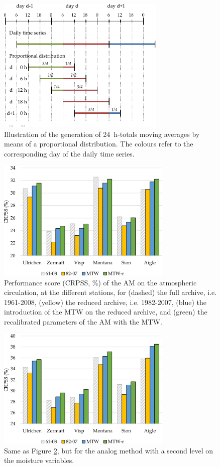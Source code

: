\documentclass[hess, manuscript]{copernicus}
\begin{document}
\begin{figure}[htb]
	\begin{center}
		\includegraphics[width=8cm]{figures/illustration_disaggregation.pdf}
	\end{center}
	\caption{Illustration of the generation of 24~h-totals moving averages by means of a proportional distribution. The colours refer to the corresponding day of the daily time series.}
	\label{fig:illustration_disaggregation}
\end{figure}

\begin{figure}[htb]
	\includegraphics[width=8.3cm]{figures/plots_CRPSS_2Z.pdf}
	\caption{Performance score (CRPSS, \%) of the AM on the atmospheric circulation, at the different stations, for (dashed) the full archive, i.e. 1961-2008, (yellow) the reduced archive, i.e. 1982-2007, (blue) the introduction of the MTW on the reduced archive, and (green) the recalibrated parameters of the AM with the MTW.}
	\label{fig:plots_CRPSS_2Z}
\end{figure}

\begin{figure}[htb]
	\includegraphics[width=8.3cm]{figures/plots_CRPSS_2Z-2MI.pdf}
	\caption{Same as Figure \ref{fig:plots_CRPSS_2Z}, but for the analog method with a second level on the moisture variables.}
	\label{fig:plots_CRPSS_2Z-2MI}
\end{figure}
\end{document}
